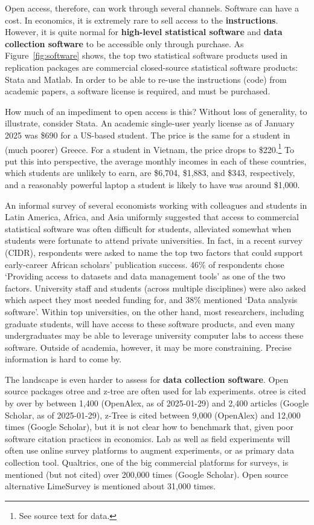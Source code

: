 \documentclass{article}
\begin{document}
Open access, therefore, can work through several channels. Software can have a cost. In economics, it is extremely rare to sell access to the \textbf{instructions}. However, it is quite normal for \textbf{high-level statistical software} and \textbf{data collection software} to be accessible only through purchase. As Figure~\ref{fig:software} shows, the top two statistical software products used in replication packages are commercial closed-source statistical software products: Stata and Matlab. In order to be able to re-use the instructions (code) from academic papers, a software license is required, and must be purchased. 

How much of an impediment to open access is this? Without loss of generality, to illustrate, consider Stata. An academic single-user yearly license as of January 2025 was \$690 for a US-based student. The price is the same for a student in (much poorer) Greece. For a student in Vietnam, the price drops to \$220.\footnote{See source text for data.}  To put this into perspective, the average monthly incomes in each of these countries, which students are unlikely to earn, are \$6,704, \$1,883, and \$343, respectively, and a reasonably powerful laptop a student is likely to have was around \$1,000. 




An informal survey of several economists working with colleagues and students in Latin America, Africa, and Asia uniformly suggested that access to commercial statistical software was often difficult for students, alleviated somewhat when students were fortunate to attend private universities. In fact, in a recent survey (CIDR), respondents were asked to name the top two factors that could support early-career African scholars’ publication success. 46\% of respondents chose 
`Providing access to datasets and data management tools' as one of the two factors. University staff and students (across multiple disciplines) were also asked which aspect they  most needed funding for, and 38\% mentioned `Data analysis software'. Within top universities, on the other hand, most researchers, including graduate students, will have access to these software products, and even many undergraduates may be able to leverage university computer labs to access these software. Outside of academia, however, it may be more constraining. Precise information is hard to come by.

The landscape is even harder to assess for \textbf{data collection software}. Open source packages otree and z-tree are often used for lab experiments. otree is cited by over by between 1,400 (OpenAlex, as of 2025-01-29) and 2,400 articles (Google Scholar, as of 2025-01-29), z-Tree is cited between 9,000 (OpenAlex) and 12,000 times (Google Scholar), but it is not clear how to benchmark that, given poor software citation practices in economics. Lab as well as field experiments will often use online survey platforms to augment experiments, or as primary data collection tool. Qualtrics, one of the big commercial platforms for surveys, is mentioned (but not cited) over 200,000 times (Google Scholar). Open source alternative LimeSurvey is mentioned about 31,000 times.
\end{document}
